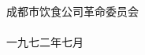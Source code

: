 \begin{center}
{%
	\Huge\bfseries%
}

\vspace{1\baselineskip}

{%
	\sffamily%
}

\vspace{21\baselineskip}

成都市饮食公司革命委员会\\
\\
一九七二年七月
\end{center}

